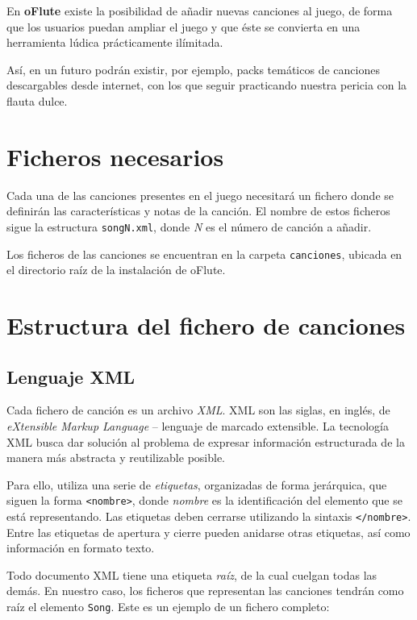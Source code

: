 En \textbf{oFlute} existe la posibilidad de añadir nuevas canciones al juego, de
forma que los usuarios puedan ampliar el juego y que éste se convierta en una
herramienta lúdica prácticamente ilímitada.

Así, en un futuro podrán existir, por ejemplo, packs temáticos de canciones
descargables desde internet, con los que seguir practicando nuestra pericia con
la flauta dulce.

\section{Ficheros necesarios}

Cada una de las canciones presentes en el juego necesitará un fichero donde se
definirán las características y notas de la canción. El nombre de estos ficheros
sigue la estructura \texttt{songN.xml}, donde \textit{N} es el número de canción
a añadir.

Los ficheros de las canciones se encuentran en la carpeta \texttt{canciones},
ubicada en el directorio raíz de la instalación de oFlute. 

\section{Estructura del fichero de canciones}

\subsection{Lenguaje XML}

Cada fichero de canción es un archivo \textit{XML}.  XML
son las siglas, en inglés, de \textit{eXtensible Markup Language} -- lenguaje de
marcado extensible. La tecnología XML busca dar solución al problema de expresar
información estructurada de la manera más abstracta y reutilizable posible. 

Para ello, utiliza una serie de \textit{etiquetas}, organizadas de forma
jerárquica, que siguen la forma \texttt{<nombre>}, donde \textit{nombre} es la
identificación del elemento que se está representando. Las etiquetas deben
cerrarse utilizando la sintaxis \texttt{</nombre>}. Entre las etiquetas de
apertura y cierre pueden anidarse otras etiquetas, así como información en
formato texto.

Todo documento XML tiene una etiqueta \textit{raíz}, de la cual cuelgan todas
las demás. En nuestro caso, los ficheros que representan las canciones tendrán
como raíz el elemento \texttt{Song}. Este es un ejemplo de un fichero completo:




